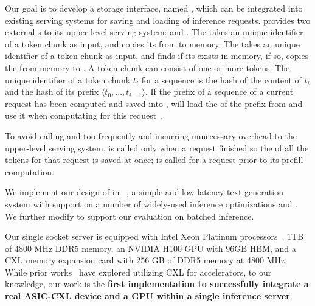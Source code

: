  Our goal is to develop a \cxl storage interface, named \tool, which can be integrated into existing \llm serving systems for saving and loading \kvcache of inference requests.
\tool provides two external \api{}s to its upper-level serving system: \apisave and \apiload. 
The \apisave takes an unique identifier of a token chunk as input, and copies its \kvcache from \gpu to \cxl memory. 
The \apiload takes an unique identifier of a token chunk as input, and finds if its  \kvcache exists in \cxl memory, if so, copies the \kvcache from \cxl memory to \gpu. A token chunk can consist of one or more tokens.
The unique identifier of a token chunk $t_i$ for a sequence is the hash of the content of $t_i$ and the hash of its prefix $\langle t_0,...,t_{i-1}\rangle$. If the prefix of a sequence of a current request has been computed and saved into \cxl, \tool will load the \kvcache of the prefix from \cxl and use it when computating for this request~\cite{pagedattenion}. 

To avoid calling \apisave and \apiload too frequently and incurring unnecessary overhead to the upper-level serving system, \apisave is called only when a request finished so the \kvcache of all the tokens for that request is saved at once; \apiload is called for a request prior to its prefill computation. 

We implement our design of \tool in \gptfast~\cite{gpt-fast}, a simple and low-latency text generation system with support on a number of widely-used inference optimizations and \llm. 
We further modify \gptfast to support our evaluation on batched inference.

Our single socket server is equipped with Intel Xeon Platinum processors~\cite{intelplatinum}, 1TB of 4800 MHz DDR5 memory, an NVIDIA H100 GPU with 96GB HBM, and a CXL memory expansion card with 256 GB of DDR5 memory at 4800 MHz. 
While prior works~\cite{cxlgpu1, cxlgpu2, cxlgpu3} have explored utilizing CXL for accelerators, to our knowledge, our work is the \textbf{first implementation to successfully integrate a real ASIC-CXL device and a GPU within a single inference server}.

